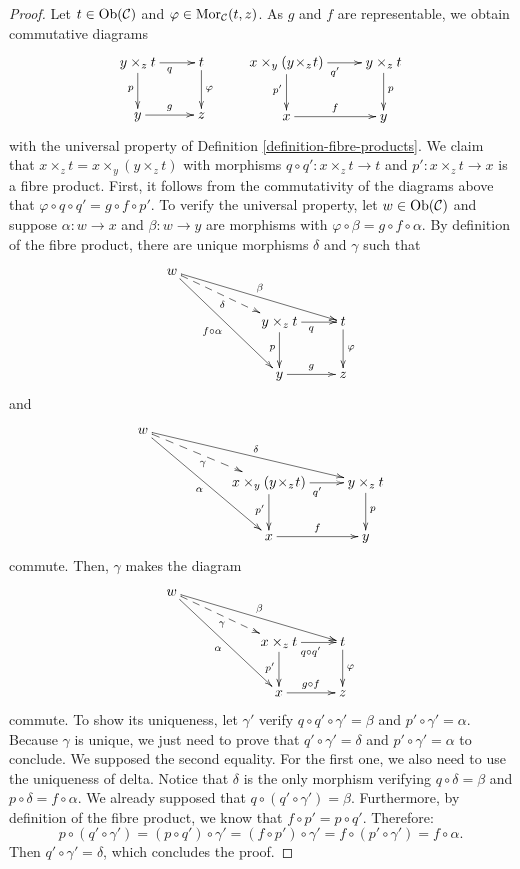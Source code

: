 \begin{proof}
Let $t \in \mathop{\mathrm{Ob}}\nolimits(\mathcal C)$ and $ \varphi \in
\mathop{\mathrm{Mor}}\nolimits_{\mathcal C}(t,z) $.
As $g$ and $f$ are representable, we obtain
commutative diagrams
$$
\xymatrix{
y \times_z t \ar[r]_q \ar[d]_p &
t \ar[d]^{\varphi} \\
y \ar[r]^{g} & z
}
\quad\quad
\xymatrix{
x \times_y (y\! \times_z\! t) \ar[r]_{q'}
\ar[d]_{p'} &
y \times_z t \ar[d]^p \\
x \ar[r]^f & y
}
$$
with the universal property of Definition
\ref{definition-fibre-products}.
We claim that $x \times_z t = x \times_y (y
\times_z t)$
with morphisms $q \circ q' : x \times_z t \to
t$ and $p' : x \times_z t \to x$
is a fibre product. First, it follows from
the commutativity of the
diagrams above that $\varphi \circ q \circ q'
= g \circ f \circ p'$.
To verify the universal property, let
$w \in \mathop{\mathrm{Ob}}\nolimits(\mathcal C)$ and suppose $\alpha :
w \to x$ and
$\beta : w \to y$ are morphisms with
$\varphi \circ \beta = g \circ f \circ
\alpha$.
By definition of the fibre product, there
are unique morphisms $\delta$ and $\gamma$
such that
$$
\xymatrix{
w \ar[rrrd]^\beta \ar@{-->}[rrd]_\delta
\ar[rrdd]_{f\circ\alpha} & & \\
& & y \times_z t \ar[d]_p \ar[r]_q & t
\ar[d]^{\varphi} \\
& & y \ar[r]^{g} & z
}
$$
and
$$
\xymatrix{
w \ar[rrrd]^\delta \ar@{-->}[rrd]_\gamma
\ar[rrdd]_{\alpha} & & \\
& & x \times_y (y\!\times_z\! t) \ar[d]_{p'}
\ar[r]_{q'} &
y \times_z t \ar[d]^{p} \\
& & x \ar[r]^{f} & y
}
$$
commute. Then, $\gamma$ makes the diagram
$$
\xymatrix{
w \ar[rrrd]^\beta \ar@{-->}[rrd]_\gamma
\ar[rrdd]_{\alpha} & & \\
& & x \times_z t \ar[d]_{p'} \ar[r]_{q\circ
q'} & t \ar[d]^{\varphi} \\
& & x \ar[r]^{g\circ f} & z
}
$$
commute. To show its uniqueness, let
$\gamma'$ verify $ q\circ q'\circ\gamma' =
\beta $ and $ p'\circ \gamma' = \alpha $.
Because $\gamma$ is unique, we just
need to prove that $ q'\circ\gamma' = \delta
$ and $ p'\circ\gamma' = \alpha $
to conclude. We supposed the second equality.
For the first one, we also need
to use the uniqueness of delta. Notice that
$\delta$ is the only morphism
verifying $ q\circ\delta = \beta $ and $
p\circ\delta = f\circ\alpha $. We
already supposed that $ q\circ
(q'\circ\gamma') = \beta $. Furthermore, by
definition of the fibre product, we know that
$ f\circ p' = p\circ q' $.
Therefore:
$$
p\circ (q'\circ\gamma') =
(p\circ q')\circ\gamma' =
(f\circ p')\circ\gamma' =
f\circ (p'\circ\gamma') = f\circ\alpha.
$$
Then $ q'\circ\gamma' = \delta $, which
concludes the proof.
\end{proof}

